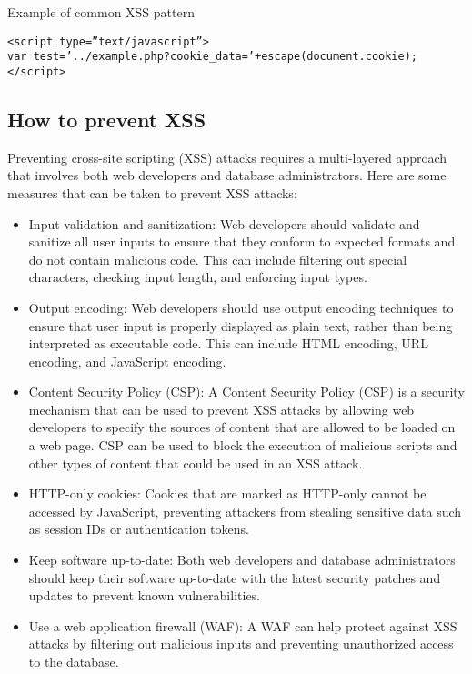 \documentclass[11pt]{article}
\begin{document}
Example of common XSS pattern\\

\begin{verbatim}
<script type=”text/javascript”>
var test=’../example.php?cookie_data=’+escape(document.cookie);
</script>
\end{verbatim}

\subsection{How to prevent XSS}
\label{sec:orge87de6c}

Preventing cross-site scripting (XSS) attacks requires a multi-layered approach that involves both web developers and database administrators. Here are some measures that can be taken to prevent XSS attacks:\\

\begin{itemize}
\item Input validation and sanitization: Web developers should validate and sanitize all user inputs to ensure that they conform to expected formats and do not contain malicious code. This can include filtering out special characters, checking input length, and enforcing input types.\\

\item Output encoding: Web developers should use output encoding techniques to ensure that user input is properly displayed as plain text, rather than being interpreted as executable code. This can include HTML encoding, URL encoding, and JavaScript encoding.\\

\item Content Security Policy (CSP): A Content Security Policy (CSP) is a security mechanism that can be used to prevent XSS attacks by allowing web developers to specify the sources of content that are allowed to be loaded on a web page. CSP can be used to block the execution of malicious scripts and other types of content that could be used in an XSS attack.\\

\item HTTP-only cookies: Cookies that are marked as HTTP-only cannot be accessed by JavaScript, preventing attackers from stealing sensitive data such as session IDs or authentication tokens.\\

\item Keep software up-to-date: Both web developers and database administrators should keep their software up-to-date with the latest security patches and updates to prevent known vulnerabilities.\\

\item Use a web application firewall (WAF): A WAF can help protect against XSS attacks by filtering out malicious inputs and preventing unauthorized access to the database.\\
\end{itemize}
\end{document}
